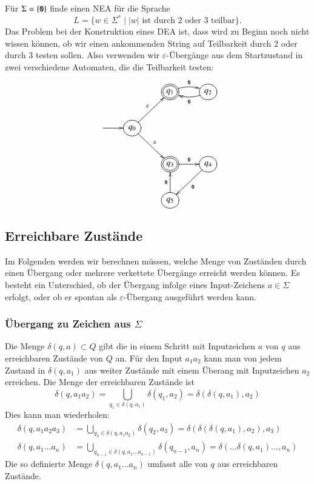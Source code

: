 \begin{beispiel}[\bf Teilbarkeit]
Für $\Sigma=\{{\tt 0}\}$ finde einen NEA für die Sprache 
\[
L=\{w\in \Sigma^*\;|\; \text{$|w|$ ist durch 2 oder 3 teilbar}\}.
\]
Das Problem bei der Konstruktion eines DEA ist, dass wird zu
Beginn noch nicht wissen können, ob wir einen ankommenden
String auf Teilbarkeit durch $2$ oder durch $3$ testen sollen.
Also verwenden wir $\varepsilon$-Übergänge aus dem Startzustand
in zwei verschiedene Automaten, die die Teilbarkeit testen:
\[
\entrymodifiers={++[o][F]}
\xymatrix{
*+\txt{}
	&*+\txt{}
		&*++[o][F=]{q_1} \ar@/^/[r]^{\tt 0}
			&{q_2} \ar@/^/[l]^{\tt 0}
\\
*+\txt{} \ar[r]
	&{q_0}\ar[ur]^{\varepsilon} \ar[dr]^{\varepsilon}
\\
*+\txt{}
	&*+\txt{}
		&*++[o][F=]{q_3}\ar[r]^{\tt 0}
			&{q_4}\ar[dl]^{\tt 0}
\\
*+\txt{}
	&*+\txt{}
		&{q_5}\ar[u]^{\tt 0}
}
\]
\end{beispiel}

\subsection{Erreichbare Zustände\label{regulaer:erreichbarezustaende}}
%
Im Folgenden werden wir berechnen müssen, welche Menge von Zuständen
durch einen Übergang oder mehrere verkettete Übergänge erreicht werden
können.
Es besteht ein Unterschied, ob der Übergang infolge eines
Input-Zeichens $a\in\Sigma$ erfolgt, oder ob er spontan als
$\varepsilon$-Übergang ausgeführt werden kann.

\subsubsection{Übergang zu Zeichen aus $\Sigma$}
Die Menge $\delta(q,a)\subset Q$ gibt die in einem Schritt mit Inputzeichen $a$
von $q$ aus erreichbaren Zustände von $Q$ an.
Für den Input $a_1a_2$ kann
man von jedem Zustand in $\delta(q,a_1)$ aus weiter Zustände mit einem
Überang mit Inputzeichen $a_2$ erreichen.
Die Menge der erreichbaren Zustände ist
\begin{equation}
\delta(q,a_1a_2)=\bigcup_{q_1\in\delta(q,a_1)}\delta(q_1, a_2)
=\delta(\delta(q,a_1),a_2)
\label{erreichbar}
\end{equation}
Dies kann man wiederholen:
\begin{align*}
\delta(q,a_1a_2a_3)&=
\bigcup_{q_2\in\delta(q, a_1a_2)}\delta(q_2,a_3)
=
\delta(\delta(\delta(q,a_1),a_2),a_3)
\\
\delta(q,a_1\dots a_n)&=\bigcup_{q_{n-1}\in\delta(q,a_1\dots a_{n-1})}\delta(q_{n-1},a_n)
=\delta(\dots \delta(q,a_1)\dots,a_n)
\end{align*}
Die so definierte Menge $\delta(q,a_1\dots a_n)$ umfasst alle von
$q$ aus erreichbaren Zustände.

